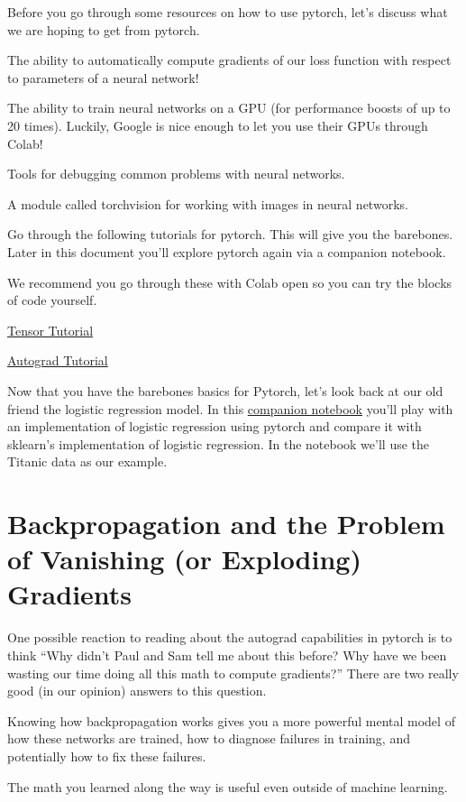 \documentclass[assignment07_Solutions]{subfiles}
\begin{document}
Before you go through some resources on how to use pytorch, let's discuss what we are hoping to get from pytorch.
\bi
\item The ability to automatically compute gradients of our loss function with respect to parameters of a neural network!
\item The ability to train neural networks on a GPU (for performance boosts of up to 20 times).  Luckily, Google is nice enough to let you use their GPUs through Colab!
\item Tools for debugging common problems with neural networks.
\item A module called torchvision for working with images in neural networks.
\ei

Go through the following tutorials for pytorch.  This will give you the barebones.  Later in this document you'll explore pytorch again via a companion notebook.
\begin{externalresources}[(15 minutes)]
We recommend you go through these with Colab open so you can try the blocks of code yourself.
\bi
\item \href{https://pytorch.org/tutorials/beginner/blitz/tensor_tutorial.html}{Tensor Tutorial} 
\item \href{https://pytorch.org/tutorials/beginner/blitz/autograd_tutorial.html}{Autograd Tutorial} 
\ei
\end{externalresources}

\begin{externalresources}[(60 minutes)]
Now that you have the barebones basics for Pytorch, let's look back at our old friend the logistic regression model.  In this \href{https://colab.research.google.com/github/mlfa19/assignments/blob/master/Module\%201/07/Assignment_07_Companion_Pytorch_Titanic.ipynb}{companion notebook} you'll play with an implementation of logistic regression using pytorch and compare it with sklearn's implementation of logistic regression.  In the notebook we'll use the Titanic data as our example.
\end{externalresources}


\section{Backpropagation and the Problem of Vanishing (or Exploding) Gradients}
One possible reaction to reading about the autograd capabilities in pytorch is to think ``Why didn't Paul and Sam tell me about this before?  Why have we been wasting our time doing all this math to compute gradients?''  There are two really good (in our opinion) answers to this question.
\be
\item Knowing how backpropagation works gives you a more powerful mental model of how these networks are trained, how to diagnose failures in training, and potentially how to fix these failures.
\item The math you learned along the way is useful even outside of machine learning.
\ee
\end{document}
